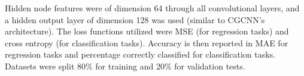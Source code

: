 \documentclass[10pt,a4paper]{article}
\begin{document}
Hidden node features were of dimension 64 through all convolutional layers, and a hidden output layer of dimension 128 was used (similar to CGCNN's architecture). The loss functions utilized were MSE (for regression tasks) and cross entropy (for classification tasks). Accuracy is then reported in MAE for regression tasks and percentage correctly classified for classification tasks. Datasets were split 80\% for training and 20\% for validation tests.
\end{document}
